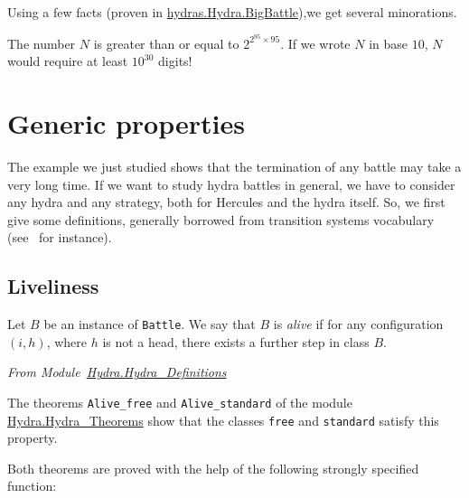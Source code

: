 \vspace{4pt}



\vspace{4pt}

Using a few facts (proven in 
\href{../theories/html/hydras.Hydra.BigBattle.html}{hydras.Hydra.BigBattle}),we get several  minorations.



\vspace{4pt}


The number $N$ is greater than or  equal to $2^{2^{95}\times 95}.$ If we wrote $N$ in base $10$, $N$ would require at least $10^{30}$ digits!


\section{Generic properties}


The example we just studied shows that the termination of any battle may take a very long time. If we want to study hydra battles in general, we have to consider 
any hydra and any strategy, both for Hercules and the hydra itself. So, we first  give some definitions, generally borrowed from transition systems vocabulary (see~\cite{tel_2000} for instance).


\subsection{Liveliness}


Let $B$ be an instance of \texttt{Battle}. We say that $B$ is \emph{alive} if
for any configuration $(i,h)$, where $h$ is not a head, there exists a further step in class $B$.


\vspace{4pt}
\emph{From Module~\href{../theories/html/hydras.Hydra.Hydra_Definitions.html\#Alive}{Hydra.Hydra\_Definitions}}




The theorems \texttt{Alive\_free} and \texttt{Alive\_standard} of the module 
\href{../theories/html/hydras.Hydra.Hydra_Theorems.html}{Hydra.Hydra\_Theorems} show that the classes \texttt{free} and \texttt{standard} satisfy this property.





Both theorems are proved with the help of the  following strongly specified function:

